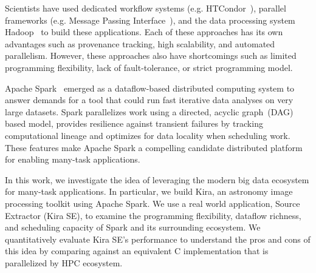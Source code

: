 \documentclass[10pt, conference, compsocconf]{IEEEtran}
\begin{document}
Scientists have used dedicated workflow systems (e.g. HTCondor~\cite{litzkow88}), parallel frameworks (e.g. Message Passing Interface~\cite{gropp96}), and  the data processing system Hadoop~\cite{HADOOP}  to build these applications. Each of these approaches has its own advantages such as provenance tracking, high scalability, and automated parallelism. However, these approaches also have shortcomings such as limited programming flexibility, lack of fault-tolerance, or strict programming model.


Apache Spark~\cite{zaharia12} emerged as a dataflow-based distributed computing system
to answer demands for a tool that could run fast iterative data analyses on very large datasets.
Spark parallelizes work using a directed, acyclic graph~(DAG) based model,
provides resilience against transient failures by tracking computational lineage
and optimizes for data locality when scheduling work.
These features make Apache Spark a compelling candidate distributed platform for enabling many-task applications.

In this work, we investigate the idea of leveraging the modern big data ecosystem for many-task applications.
In particular, we build Kira, an astronomy image processing toolkit using Apache Spark.
We use a real world application, Source Extractor (Kira SE), to examine the programming flexibility, dataflow richness,
and scheduling capacity of Spark and its surrounding ecosystem. 
We quantitatively evaluate Kira SE's performance to understand the pros and cons of this idea by comparing against
an equivalent C implementation that is parallelized by HPC ecosystem.

\end{document}
